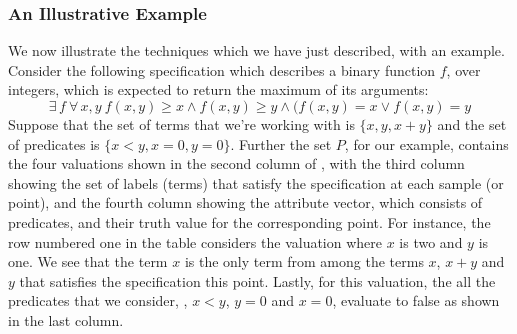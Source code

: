 \subsubsection{An Illustrative Example}

We now illustrate the techniques which we have just described, with an
example. Consider the following specification which describes a binary
function $f$, over integers, which is expected to return the maximum
of its arguments:
\begin{equation*}
\exists\,f\ \forall\,x, y\ f(x, y) \geq x \wedge f(x, y) \geq y \wedge
(f(x, y) = x \vee f(x, y) = y
\end{equation*}
Suppose that the set of terms that we're working with is $\{x, y,
x+y\}$ and the set of predicates is $\{x < y, x = 0, y = 0\}$.
Further the set $P$, for our example, contains the four valuations
shown in the second column of , with the third
column showing the set of labels (terms) that satisfy the
specification at each sample (or point), and the fourth column showing
the attribute vector, which consists of predicates, and their truth
value for the corresponding point. For instance, the row numbered one
in the table considers the valuation where $x$ is two and $y$ is
one. We see that the term $x$ is the only term from among the terms
$x$, $x+y$ and $y$ that satisfies the specification this
point. Lastly, for this valuation, the all the predicates that we
consider, \ie, $x < y$, $y = 0$ and $x = 0$, evaluate to false as
shown in the last column.

